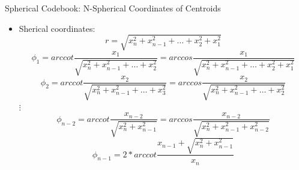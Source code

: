 \documentclass[10pt]{beamer}
\begin{document}
\begin{frame}{Spherical Codebook: N-Spherical Coordinates of Centroids}
  \begin{itemize}
    \item Sherical coordinates:
    \begin{equation*}
      r = \sqrt{x_{n}^2 + x_{n-1}^2 + \dotsc + x_{2}^2 + x_{1}^2}
    \end{equation*}
    \begin{equation*}
      \phi_{1} = arccot \frac{x_{1}}{\sqrt{x_{n}^2 + x_{n-1}^2 + \dotsc + x_{2}^2}} = arccos \frac{x_{1}}{\sqrt{x_{n}^2 + x_{n-1}^2 + \dotsc + x_{2}^2 + x_{1}^2}}
    \end{equation*}
    \begin{equation*}
      \phi_{2} = arccot \frac{x_{2}}{\sqrt{x_{n}^2 + x_{n-1}^2 + \dotsc + x_{3}^2}} = arccos \frac{x_{2}}{\sqrt{x_{n}^2 + x_{n-1}^2 + \dotsc + x_{2}^2}}
    \end{equation*}
    \centering $\vdots$
    \begin{equation*}
      \phi_{n-2} = arccot \frac{x_{n-2}}{\sqrt{x_{n}^2 + x_{n-1}^2}} = arccos \frac{x_{n-2}}{\sqrt{x_{n}^2 + x_{n-1}^2 + x_{n-2}^2}}
    \end{equation*}
    \begin{equation*}
      \phi_{n-1} = 2*arccot\frac{x_{n-1} + \sqrt{x_{n}^2 + x_{n-1}^2}}{x_{n}}
    \end{equation*}
  \end{itemize}
\end{frame}
\end{document}
